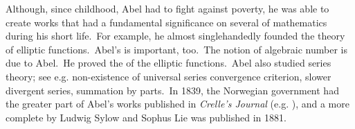 \documentclass[12pt]{article}
\theoremstyle{definition}
\begin{document}
Although, since childhood, Abel had to fight against poverty, he was able to create works that had a fundamental significance on several  of mathematics during his short life.\, For example, he almost singlehandedly founded the theory of elliptic functions.\, Abel's  is important, too.\, The notion of algebraic number is due to Abel.\, He proved the  of the elliptic functions.\, Abel also studied series theory; see e.g. non-existence of universal series convergence criterion, slower divergent series, summation by parts.\, In 1839, the Norwegian government had the greater part of Abel's works published in \emph{Crelle's Journal} (e.g. ), and a more complete  by Ludwig Sylow and Sophus Lie was published in 1881.

\end{document}
